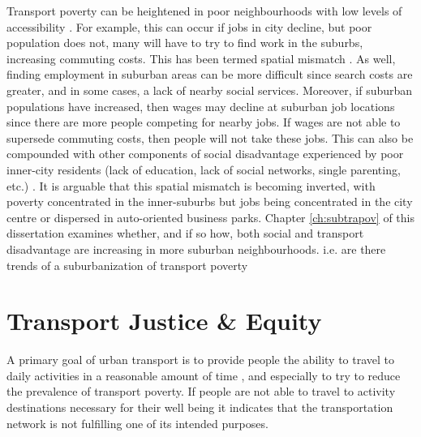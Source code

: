 Transport poverty can be heightened in poor neighbourhoods with low levels of accessibility \cite{lucas_is_2018, allen_sizing_2019}. For example, this can occur if jobs in city decline, but poor population does not, many will have to try to find work in the suburbs, increasing commuting costs. This has been termed spatial mismatch \cite{holzer_spatial_1991}. As well, finding employment in suburban areas can be more difficult since search costs are greater, and in some cases, a lack of nearby social services. Moreover, if suburban populations have increased, then wages may decline at suburban job locations since there are more people competing for nearby jobs. If wages are not able to supersede commuting costs, then people will not take these jobs. This can also be compounded with other components of social disadvantage experienced by poor inner-city residents (lack of education, lack of social networks, single parenting, etc.) \cite{holzer_spatial_1991}. It is arguable that this spatial mismatch is becoming inverted, with poverty concentrated in the inner-suburbs but jobs being concentrated in the city centre or dispersed in auto-oriented business parks. Chapter \ref{ch:subtrapov} of this dissertation examines whether, and if so how, both social and transport disadvantage are increasing in more suburban neighbourhoods. i.e. are there trends of a suburbanization of transport poverty







\section{Transport Justice \& Equity}


A primary goal of urban transport is to provide people the ability to travel to daily activities in a reasonable amount of time \cite{martens_transport_2016}, and especially to try to reduce the prevalence of transport poverty. If people are not able to travel to activity destinations necessary for their well being it indicates that the transportation network is not fulfilling one of its intended purposes. 

